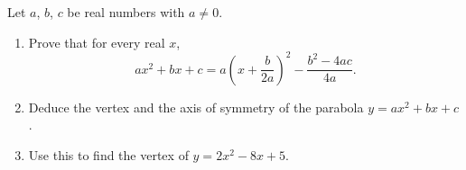 Let $a$, $b$, $c$ be real numbers with $a\ne0$.
\begin{enumerate}
\item[(a)] Prove that for every real $x$,
\[
ax^2+bx+c=a\left(x+\dfrac{b}{2a}\right)^2-\dfrac{b^2-4ac}{4a}.
\]
\item[(b)] Deduce the vertex and the axis of symmetry of the parabola $y=ax^2+bx+c$.
\item[(c)] Use this to find the vertex of $y=2x^2-8x+5$.
\end{enumerate}

